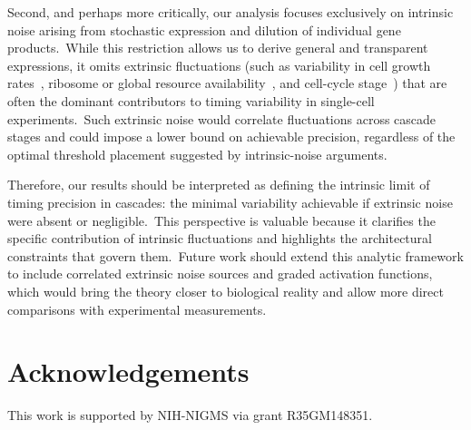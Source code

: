\documentclass[aps,prb,reprint,superscriptaddress]{revtex4-2}
\begin{document}
Second, and perhaps more critically, our analysis focuses exclusively on intrinsic noise arising from stochastic expression and dilution of individual gene products.~While this restriction allows us to derive general and transparent expressions, it omits extrinsic fluctuations (such as variability in cell growth rates~\cite{Klumpp_Zhang_Hwa_2009, Keren_vanDijk_Weingarten-Gabbay_Davidi_Jona_Weinberger_Milo_Segal_2015, Weiße_Oyarzún_Danos_Swain_2015}, ribosome or global resource availability~\cite{pavlou2025single}, and cell-cycle stage~\cite{Sukys_Grima_2025}) that are often the dominant contributors to timing variability in single-cell experiments.~Such extrinsic noise would correlate fluctuations across cascade stages and could impose a lower bound on achievable precision, regardless of the optimal threshold placement suggested by intrinsic-noise arguments.

Therefore, our results should be interpreted as defining the intrinsic limit of timing precision in cascades: the minimal variability achievable if extrinsic noise were absent or negligible.~This perspective is valuable because it clarifies the specific contribution of intrinsic fluctuations and highlights the architectural constraints that govern them.~Future work should extend this analytic framework to include correlated extrinsic noise sources and graded activation functions, which would bring the theory closer to biological reality and allow more direct comparisons with experimental measurements.
\section*{Acknowledgements}

This work is supported by NIH-NIGMS via grant R35GM148351.
 


\end{document}
